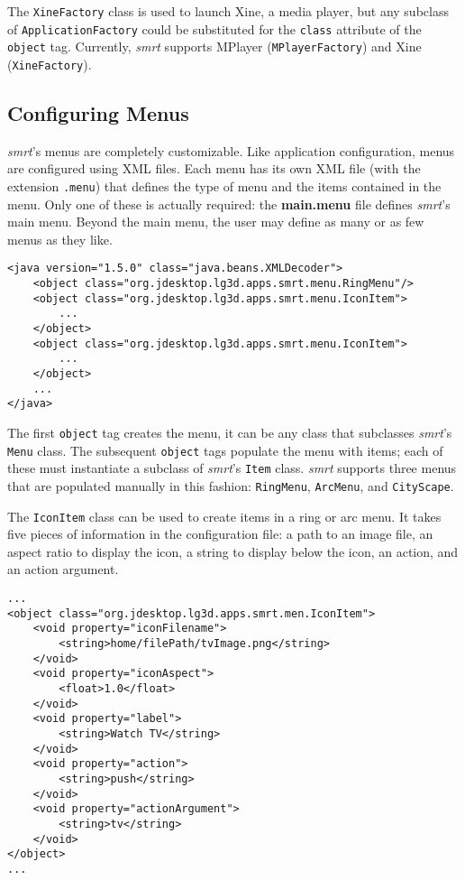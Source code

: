 \documentclass[letterpaper, titlepage, 11pt]{article}
\begin{document}
The \texttt{XineFactory} class is used to launch Xine, a media player, but any
subclass of \texttt{ApplicationFactory} could be substituted for the
\texttt{class} attribute of the \texttt{object} tag.  Currently, \textit{smrt}
supports MPlayer (\texttt{MPlayerFactory}) and Xine (\texttt{XineFactory}).

\subsection{Configuring Menus}
\textit{smrt}'s menus are completely customizable.  Like application
configuration, menus are configured using XML files.  Each menu has its own XML
file (with the extension \texttt{.menu}) that defines the type of menu and the
items contained in the menu.  Only one of these is actually required: the
\textbf{main.menu} file defines \textit{smrt}'s main menu.  Beyond the main
menu, the user may define as many or as few menus as they like.

\begin{verbatim}
<java version="1.5.0" class="java.beans.XMLDecoder">
    <object class="org.jdesktop.lg3d.apps.smrt.menu.RingMenu"/>
    <object class="org.jdesktop.lg3d.apps.smrt.menu.IconItem">
        ...
    </object>
    <object class="org.jdesktop.lg3d.apps.smrt.menu.IconItem">
        ...
    </object>
    ...
</java>
\end{verbatim}

The first \texttt{object} tag creates the menu, it can be any class that
subclasses \textit{smrt}'s \texttt{Menu} class.  The subsequent \texttt{object}
tags populate the menu with items; each of these must instantiate a subclass of
\textit{smrt}'s \texttt{Item} class.  \textit{smrt} supports three menus that
are populated manually in this fashion: \texttt{RingMenu}, \texttt{ArcMenu}, and
\texttt{CityScape}.

The \texttt{IconItem} class can be used to create items in a ring or arc menu.
It takes five pieces of information in the configuration file: a path to an
image file, an aspect ratio to display the icon, a string to display below the
icon, an action, and an action argument.

\begin{verbatim}
...
<object class="org.jdesktop.lg3d.apps.smrt.men.IconItem">
    <void property="iconFilename">
        <string>home/filePath/tvImage.png</string>
    </void>
    <void property="iconAspect">
        <float>1.0</float>
    </void>
    <void property="label">
        <string>Watch TV</string>
    </void>
    <void property="action">
        <string>push</string>
    </void>
    <void property="actionArgument">
        <string>tv</string>
    </void>
</object>
...
\end{verbatim}
\end{document}
